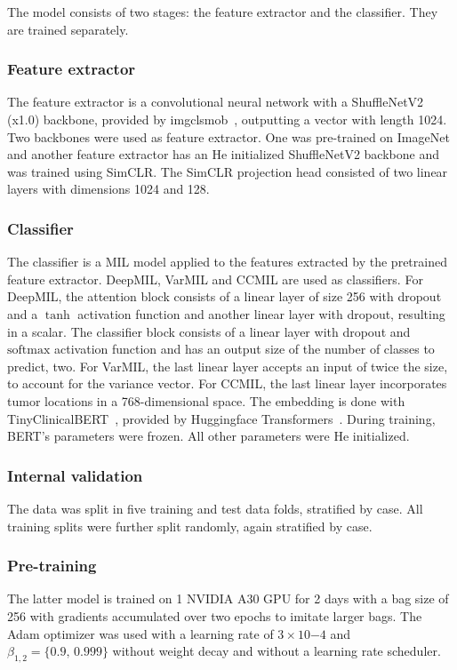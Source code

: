 The model consists of two stages: the feature extractor and the classifier.
They are trained separately.

\subsubsection{Feature extractor}
The feature extractor is a convolutional neural network with a ShuffleNetV2 (x1.0) backbone, provided by imgclsmob~\cite{imgclsmob2023}, outputting a vector with length 1024.
Two backbones were used as feature extractor.
One was pre-trained on ImageNet and another feature extractor has an He initialized ShuffleNetV2 backbone and was trained using SimCLR.
The SimCLR projection head consisted of two linear layers with dimensions 1024 and 128.

\subsubsection{Classifier}
The classifier is a MIL model applied to the features extracted by the pretrained feature extractor.
DeepMIL, VarMIL and CCMIL are used as classifiers.
For DeepMIL, the attention block consists of a linear layer of size 256 with dropout and a $\tanh$ activation function and another linear layer with dropout, resulting in a scalar.
The classifier block consists of a linear layer with dropout and $\mathrm{softmax}$ activation function and has an output size of the number of classes to predict, \ie two.
For VarMIL, the last linear layer accepts an input of twice the size, to account for the variance vector.
For CCMIL, the last linear layer incorporates tumor locations in a 768-dimensional space.
The embedding is done with TinyClinicalBERT~\cite{Rohanian2023}, provided by Huggingface Transformers~\cite{Wolf2020}.
During training, BERT's parameters were frozen.
All other parameters were He initialized.

\subsubsection{Internal validation}
The data was split in five training and test data folds, stratified by case.
All training splits were further split randomly, again stratified by case.

\subsubsection{Pre-training}
The latter model is trained on 1 NVIDIA A30 GPU for 2 days with a bag size of 256 with gradients accumulated over two epochs to imitate larger bags.
The Adam optimizer was used with a learning rate of $3\times 10{-4}$ and $\beta_{1,2} = \{0.9,\, 0.999\}$ without weight decay and without a learning rate scheduler.

